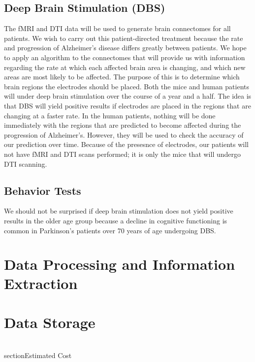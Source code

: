 \documentclass{article}
\begin{document}
\subsection{Deep Brain Stimulation (DBS)}
The fMRI and DTI data will be used to generate brain connectomes for all patients. We wish to carry out this patient-directed treatment because the rate and progression of Alzheimer's disease differs greatly between patients. We hope to apply an algorithm to the connectomes that will provide us with information regarding the rate at which each affected brain area is changing, and which new areas are most likely to be affected. The purpose of this is to determine which brain regions the electrodes should be placed. Both the mice and human patients will under deep brain stimulation over the course of a year and a half. The idea is that DBS will yield positive results if electrodes are placed in the regions that are changing at a faster rate. In the human patients, nothing will be done immediately with the regions that are predicted to become affected during the progression of Alzheimer's. However, they will be used to check the accuracy of our prediction over time. Because of the presesnce of electrodes, our patients will not have fMRI and DTI scans performed; it is only the mice that will undergo DTI scanning.

\subsection{Behavior Tests}

We should not be surprised if deep brain stimulation does not yield positive results in the older age group because a decline in cognitive functioning is common in Parkinson's patients over 70 years of age undergoing DBS.

\section{Data Processing and Information Extraction}

\section{Data Storage}

\\section{Estimated Cost}
\end{document}
